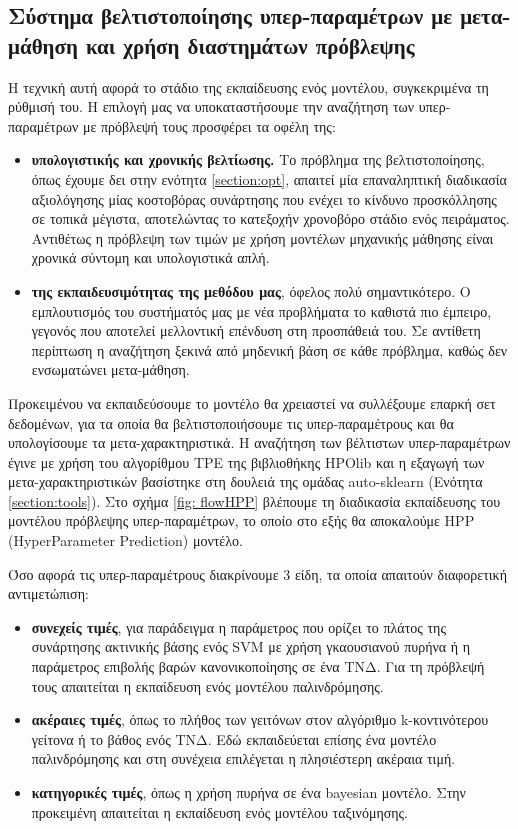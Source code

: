 \subsection{Σύστημα βελτιστοποίησης υπερ-παραμέτρων με μετα-μάθηση και χρήση διαστημάτων πρόβλεψης} \label{sec:HPP}
Η τεχνική αυτή αφορά το στάδιο της εκπαίδευσης ενός μοντέλου, συγκεκριμένα τη ρύθμισή του. Η επιλογή μας να υποκαταστήσουμε την αναζήτηση των υπερ-παραμέτρων με πρόβλεψή τους προσφέρει τα οφέλη της:
\begin{itemize}
	\item \textbf{υπολογιστικής και χρονικής βελτίωσης.} Το πρόβλημα της βελτιστοποίησης, όπως έχουμε δει στην ενότητα \ref{section:opt}, απαιτεί μία επαναληπτική διαδικασία αξιολόγησης μίας κοστοβόρας συνάρτησης που ενέχει το κίνδυνο προσκόλλησης σε τοπικά μέγιστα, αποτελώντας το κατεξοχήν χρονοβόρο στάδιο ενός πειράματος. Αντιθέτως η πρόβλεψη των τιμών με χρήση μοντέλων μηχανικής μάθησης είναι χρονικά σύντομη και υπολογιστικά απλή.
	\item \textbf{της εκπαιδευσιμότητας της μεθόδου μας}, όφελος πολύ σημαντικότερο. Ο εμπλουτισμός του συστήματός μας με νέα προβλήματα το καθιστά πιο έμπειρο, γεγονός που αποτελεί μελλοντική επένδυση στη προσπάθειά του. Σε αντίθετη περίπτωση η αναζήτηση ξεκινά από μηδενική βάση σε κάθε πρόβλημα, καθώς δεν ενσωματώνει μετα-μάθηση. 
\end{itemize}

Προκειμένου να εκπαιδεύσουμε το μοντέλο θα χρειαστεί να συλλέξουμε επαρκή σετ δεδομένων, για τα οποία θα βελτιστοποιήσουμε τις υπερ-παραμέτρους και θα υπολογίσουμε τα μετα-χαρακτηριστικά. Η αναζήτηση των βέλτιστων υπερ-παραμέτρων έγινε με χρήση του αλγορίθμου TPE της βιβλιοθήκης HPOlib και η εξαγωγή των μετα-χαρακτηριστικών βασίστηκε στη δουλειά της ομάδας auto-sklearn (Ενότητα \ref{section:tools}). Στο σχήμα \ref{fig: flowHPP} βλέπουμε τη διαδικασία εκπαίδευσης του μοντέλου πρόβλεψης υπερ-παραμέτρων, το οποίο στο εξής θα αποκαλούμε HPP (HyperParameter Prediction) μοντέλο.

Όσο αφορά τις υπερ-παραμέτρους διακρίνουμε 3 είδη, τα οποία απαιτούν διαφορετική αντιμετώπιση:
\begin{itemize}
	\item \textbf{συνεχείς τιμές}, για παράδειγμα η παράμετρος που ορίζει το πλάτος της συνάρτησης ακτινικής βάσης ενός SVM με χρήση γκαουσιανού πυρήνα ή η παράμετρος επιβολής βαρών κανονικοποίησης σε ένα \gls{ΤΝΔ}. Για τη πρόβλεψή τους απαιτείται η εκπαίδευση ενός μοντέλου παλινδρόμησης.
	\item \textbf{ακέραιες τιμές}, όπως το πλήθος των γειτόνων στον αλγόριθμο k-κοντινότερου γείτονα ή το βάθος ενός \gls{ΤΝΔ}. Εδώ εκπαιδεύεται επίσης ένα μοντέλο παλινδρόμησης και στη συνέχεια επιλέγεται η πλησιέστερη ακέραια τιμή.
	\item \textbf{κατηγορικές τιμές}, όπως η χρήση πυρήνα σε ένα bayesian μοντέλο. Στην προκειμένη απαιτείται η εκπαίδευση ενός μοντέλου ταξινόμησης.
\end{itemize}



